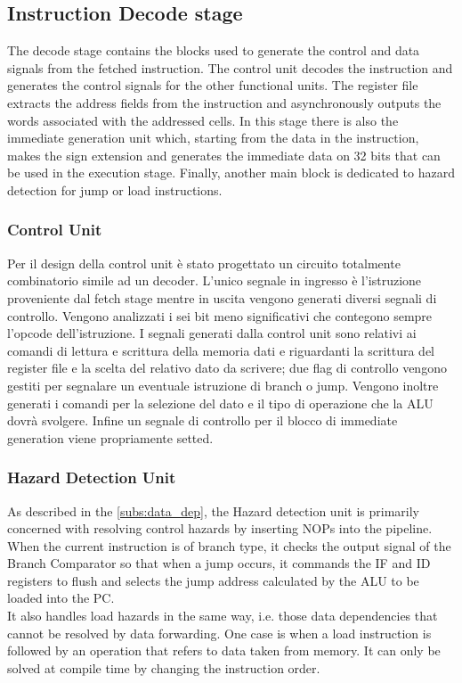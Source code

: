 \subsection{Instruction Decode stage}
The decode stage contains the blocks used to generate the control and data signals from the fetched instruction. The control unit decodes the instruction and generates the control signals for the other functional units. The register file extracts the address fields from the instruction and asynchronously outputs the words associated with the addressed cells. In this stage there is also the immediate generation unit which, starting from the data in the instruction, makes the sign extension and generates the immediate data on 32 bits that can be used in the execution stage. Finally, another main block is dedicated to hazard detection for jump or load instructions.

\subsubsection{Control Unit}
Per il design della control unit è stato progettato un circuito totalmente combinatorio simile ad un decoder. L'unico segnale in ingresso è l'istruzione proveniente dal fetch stage mentre in uscita vengono generati diversi segnali di controllo. Vengono analizzati i sei bit meno significativi che contegono sempre l'opcode dell'istruzione.
I segnali generati dalla control unit sono relativi ai comandi di lettura e scrittura della memoria dati e riguardanti la scrittura del register file e la scelta del relativo dato da scrivere; due flag di controllo vengono gestiti per segnalare un eventuale istruzione di branch o jump. Vengono inoltre generati i comandi per la selezione del dato e il tipo di operazione che la ALU dovrà svolgere. Infine un segnale di controllo per il blocco di immediate generation viene propriamente setted.


\subsubsection{Hazard Detection Unit}
As described in the \autoref{subs:data_dep}, the Hazard detection unit is primarily concerned with resolving control hazards by inserting NOPs into the pipeline.
When the current instruction is of branch type, it checks the output signal of the Branch Comparator so that when a jump occurs, it commands the IF and ID registers to flush and selects the jump address calculated by the ALU to be loaded into the PC.\\
It also handles load hazards in the same way, i.e. those data dependencies that cannot be resolved by data forwarding. One case is when a load instruction is followed by an operation that refers to data taken from memory. It can only be solved at compile time by changing the instruction order.

